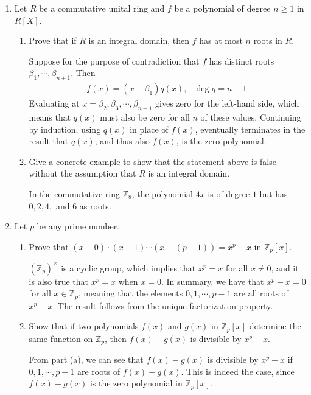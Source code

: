 \documentclass[12pt]{article}
\newcommand{\ZZ}{\mathbb{Z}}
\begin{document}
\begin{enumerate}
    \item Let $R$ be a commutative unital ring and $f$ be a polynomial of degree $n \geq 1$ in $R[X]$.
    \begin{enumerate}
        \item Prove that if $R$ is an integral domain, then $f$ has at most $n$ roots in $R$. \par
            Suppose for the purpose of contradiction that $f$ has distinct roots $\beta_1, \cdots, \beta_{n + 1}$. Then
            \begin{align*}
                f(x) = (x - \beta_1) q(x), \quad \text{deg }q = n - 1.
            \end{align*}
            Evaluating at $x = \beta_2, \beta_3, \cdots, \beta_{n + 1}$ gives zero for the left-hand side, which means that $q(x)$ must also be zero for all $n$ of these values. Continuing by induction, using $q(x)$ in place of $f(x)$, eventually terminates in the result that $q(x)$, and thus also $f(x)$, is the zero polynomial.

        \item Give a concrete example to show that the statement above is false without the assumption that $R$ is an integral domain. \par
            In the commutative ring $\mathbb{Z}_8$, the polynomial $4x$ is of degree $1$ but has $0, 2, 4,$ and $6$ as roots.
    \end{enumerate}

    \item Let $p$ be any prime number. 
    \begin{enumerate}
        \item Prove that $(x-0)\cdot(x-1)\cdots(x-(p-1)) = x^p - x$ in $\ZZ_p[x]$. \par
            $(\ZZ_p)^\times$ is a cyclic group, which implies that $x^p = x$ for all $x \neq 0$, and it is also true that $x^p = x$ when $x = 0$. In summary, we have that $x^p - x = 0$ for all $x \in \ZZ_p$, meaning that the elements $0, 1, \cdots, p - 1$ are all roots of $x^p - x$. The result follows from the unique factorization property.
        \item Show that if two polynomials $f(x)$ and $g(x)$ in $\ZZ_p[x]$ determine the same function on $\ZZ_p$, then $f(x)-g(x)$ is divisible by $x^p - x$. \par
            From part (a), we can see that $f(x) - g(x)$ is divisible by $x^p - x$ if $0, 1, \cdots, p - 1$ are roots of $f(x) - g(x)$. This is indeed the case, since $f(x) - g(x)$ is the zero polynomial in $\ZZ_p[x]$.
    \end{enumerate}


\end{enumerate}
\end{document}
